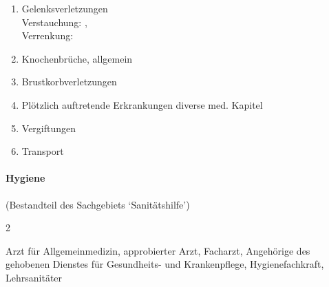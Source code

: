 \begin{enumerate}
    \item    Gelenksverletzungen
    \\
    Verstauchung:  \dotfill {},
    \\
    Verrenkung:  \dotfill {}
    \item
    Knochenbrüche, allgemein \dotfill  \noindent{}
    \item
    Brustkorbverletzungen
    \\
    \item    Plötzlich auftretende Erkrankungen \dotfill  diverse med. Kapitel
    \item    Vergiftungen \dotfill {}
    \item    Transport \dotfill {}
  \end{enumerate}

\paragraph{Hygiene}
(Bestandteil des Sachgebiets \enquote*{Sanitätshilfe})
  
  \begin{inparadesc}
    \item[Stundenanzahl:] 2
    \item[Lehrkraft:] Arzt für Allgemeinmedizin, approbierter Arzt,
    Facharzt, Angehörige des gehobenen Dienstes für Gesundheits- und Krankenpflege,
    Hygienefachkraft,  Lehrsanitäter
  \end{inparadesc}
  
